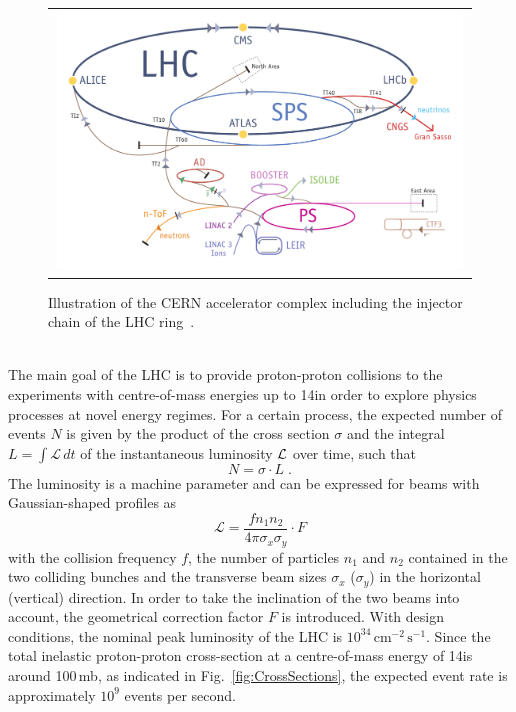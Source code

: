 \begin{figure}[!t]
  \centering 
  \begin{tabular}{c}
    \includegraphics[width=0.99\textwidth]{figures/lhc.pdf}
  \end{tabular}
  \caption{Illustration of the CERN accelerator complex including the injector chain of the LHC ring~\cite{CERNaccelerators}.}
  \label{fig:AccComplex}
\end{figure}
\\
The main goal of the LHC is to provide proton-proton collisions to the experiments with centre-of-mass energies up to 14\tev in order to explore physics processes at novel energy regimes. For a certain process, the expected number of events $N$ is given by the product of the cross section $\sigma$ and the integral $L = \int \mathcal{L}  \, dt$ of the instantaneous luminosity $\cal L$ over time, such that
\begin{equation}
  N = \sigma \cdot L \; . 
  \label{eq:lumi}
\end{equation}
The luminosity is a machine parameter and can be expressed for beams with Gaussian-shaped profiles as  
\begin{equation}
  \mathcal{L} = \frac{f n_{1} n_{2}}{4 \pi \sigma_{x} \sigma_{y}} \cdot F
  \label{eq:lumi}
\end{equation}
with the collision frequency $f$, the number of particles $n_1$ and $n_2$ contained in the two colliding bunches and the transverse beam sizes $\sigma_{x}$ ($\sigma_{y}$) in the horizontal (vertical) direction. In order to take the inclination of the two beams into account, the geometrical correction factor $F$ is introduced. With design conditions, the nominal peak luminosity of the LHC is $10^{34} \, \mathrm{cm}^{-2} \, \mathrm{s}^{-1}$. Since the total inelastic proton-proton cross-section at a centre-of-mass energy of 14\tev is around 100\,mb, as indicated in Fig.~\ref{fig:CrossSections}, the expected event rate is approximately $10^9$ events per second. \\
